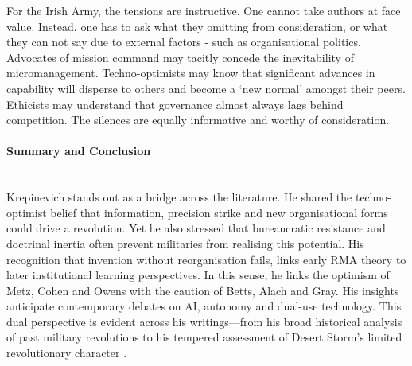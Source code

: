For the Irish Army, the tensions are instructive. One cannot take authors at face value. Instead, one has to ask what they omitting from consideration, or what they can not say due to external factors - such as organisational politics. Advocates of mission command may tacitly concede the inevitability of micromanagement. Techno-optimists may know that significant advances in capability will disperse to others and become a `new normal' amongst their peers. Ethicists may understand that governance almost always lags behind competition. The silences are equally informative and worthy of consideration. 





\paragraph{Summary and Conclusion}\mbox{}\\
Krepinevich stands out as a bridge across the literature. He shared the techno-optimist belief that information, precision strike and new organisational forms could drive a revolution. Yet he also stressed that bureaucratic resistance and doctrinal inertia often prevent militaries from realising this potential. His recognition that invention without reorganisation fails, links early RMA theory to later institutional learning perspectives. In this sense, he links the optimism of Metz, Cohen and Owens with the caution of Betts, Alach and Gray. His insights anticipate contemporary debates on AI, autonomy and dual-use technology. This dual perspective is evident across his writings—from his broad historical analysis of past military revolutions \parencite{KREPINEVICH_1994} to his tempered assessment of Desert Storm’s limited revolutionary character \parencite{KREPINEVICH_1996}.







